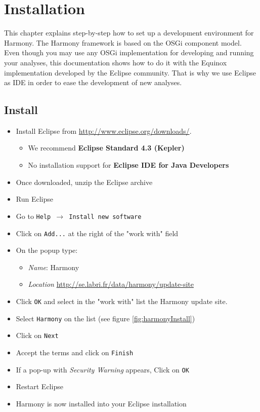 \chapter{Installation}\label{chap:install}

This chapter explains step-by-step how to set up a development environment for Harmony.  The Harmony framework is based on the OSGi component model. Even though you may use any OSGi implementation for developing and running your analyses, this documentation shows how to do it with the Equinox implementation developed by the Eclipse community. That is why we use Eclipse as IDE in order to ease the development of new analyses.


\section{Install}



\begin{itemize}
	\item Install Eclipse from \url{http://www.eclipse.org/downloads/}. 
		\begin{itemize}
			\item We recommend {\color{ggreen}\textbf{Eclipse Standard 4.3 (Kepler)}}
			\item No installation support for {\color{gred}\textbf{Eclipse IDE for Java Developers}}
		\end{itemize}
			\item Once downloaded, unzip the Eclipse archive
			\item Run Eclipse
			\item Go to \texttt{Help $\rightarrow$ Install new software}
			\item Click on \texttt{Add...} at the right of the "work with" field
			\item On the popup type:
			\begin{itemize}
				\item \emph{Name}: Harmony
				\item \emph{Location} \url{http://se.labri.fr/data/harmony/update-site}
			\end{itemize}
			\item Click \texttt{OK} and select in the "work with" list the Harmony update site.
			\item Select \texttt{Harmony} on the list (see figure \ref{fig:harmonyInstall})
			\item Click on \texttt{Next}
			\item Accept the terms and click on \texttt{Finish}
			\item If a pop-up with \emph{Security Warning} appears, Click on \texttt{OK}
			\item Restart Eclipse
			\item Harmony is now installed into your Eclipse installation
\end{itemize}



